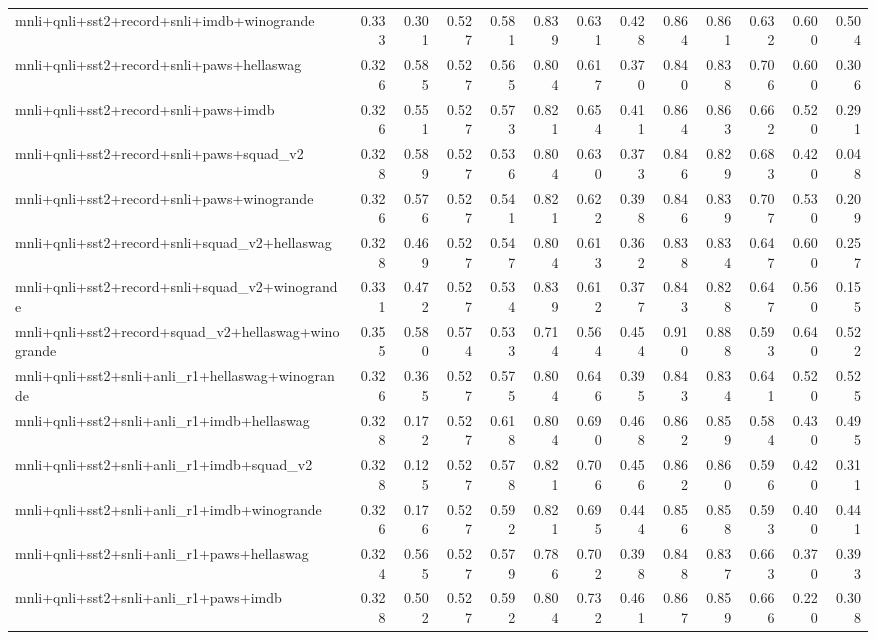 \begin{table}[t]
\begin{tabular}{lrrrrrrrrrrrr}
    mnli+qnli+sst2+record+snli+imdb+winogrande & 0.333 & 0.301 & 0.527 & 0.581 & 0.839 & 0.631 & 0.428 & 0.864 & 0.861 & 0.632 & 0.600 & 0.504 \\
    mnli+qnli+sst2+record+snli+paws+hellaswag & 0.326 & 0.585 & 0.527 & 0.565 & 0.804 & 0.617 & 0.370 & 0.840 & 0.838 & 0.706 & 0.600 & 0.306 \\
    mnli+qnli+sst2+record+snli+paws+imdb & 0.326 & 0.551 & 0.527 & 0.573 & 0.821 & 0.654 & 0.411 & 0.864 & 0.863 & 0.662 & 0.520 & 0.291 \\
    mnli+qnli+sst2+record+snli+paws+squad\_v2 & 0.328 & 0.589 & 0.527 & 0.536 & 0.804 & 0.630 & 0.373 & 0.846 & 0.829 & 0.683 & 0.420 & 0.048 \\
    mnli+qnli+sst2+record+snli+paws+winogrande & 0.326 & 0.576 & 0.527 & 0.541 & 0.821 & 0.622 & 0.398 & 0.846 & 0.839 & 0.707 & 0.530 & 0.209 \\
    mnli+qnli+sst2+record+snli+squad\_v2+hellaswag & 0.328 & 0.469 & 0.527 & 0.547 & 0.804 & 0.613 & 0.362 & 0.838 & 0.834 & 0.647 & 0.600 & 0.257 \\
    mnli+qnli+sst2+record+snli+squad\_v2+winogrande & 0.331 & 0.472 & 0.527 & 0.534 & 0.839 & 0.612 & 0.377 & 0.843 & 0.828 & 0.647 & 0.560 & 0.155 \\
    mnli+qnli+sst2+record+squad\_v2+hellaswag+winogrande & 0.355 & 0.580 & 0.574 & 0.533 & 0.714 & 0.564 & 0.454 & 0.910 & 0.888 & 0.593 & 0.640 & 0.522 \\
    mnli+qnli+sst2+snli+anli\_r1+hellaswag+winogrande & 0.326 & 0.365 & 0.527 & 0.575 & 0.804 & 0.646 & 0.395 & 0.843 & 0.834 & 0.641 & 0.520 & 0.525 \\
    mnli+qnli+sst2+snli+anli\_r1+imdb+hellaswag & 0.328 & 0.172 & 0.527 & 0.618 & 0.804 & 0.690 & 0.468 & 0.862 & 0.859 & 0.584 & 0.430 & 0.495 \\
    mnli+qnli+sst2+snli+anli\_r1+imdb+squad\_v2 & 0.328 & 0.125 & 0.527 & 0.578 & 0.821 & 0.706 & 0.456 & 0.862 & 0.860 & 0.596 & 0.420 & 0.311 \\
    mnli+qnli+sst2+snli+anli\_r1+imdb+winogrande & 0.326 & 0.176 & 0.527 & 0.592 & 0.821 & 0.695 & 0.444 & 0.856 & 0.858 & 0.593 & 0.400 & 0.441 \\
    mnli+qnli+sst2+snli+anli\_r1+paws+hellaswag & 0.324 & 0.565 & 0.527 & 0.579 & 0.786 & 0.702 & 0.398 & 0.848 & 0.837 & 0.663 & 0.370 & 0.393 \\
    mnli+qnli+sst2+snli+anli\_r1+paws+imdb & 0.328 & 0.502 & 0.527 & 0.592 & 0.804 & 0.732 & 0.461 & 0.867 & 0.859 & 0.666 & 0.220 & 0.308 \\

\end{tabular}
\end{table}
